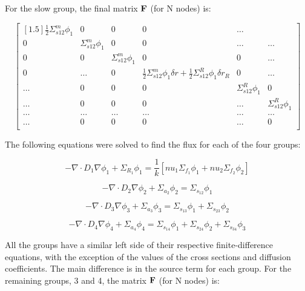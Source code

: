 \documentclass[../main.tex]{subfiles}
\begin{document}
For the slow group, the final matrix $\mathbf{F}$ (for N nodes) is:

\[
	\begin{bmatrix}[1.5]
		\frac{1}{2} \Sigma^m_{s12} \phi_1  & 0 & 0 & 0 & \dots\\
		0 & \Sigma^m_{s12} \phi_1 & 0 & 0 & \dots & \dots \\
		0 & 0 & \Sigma^m_{s12} \phi_1 & 0 & 0 & \dots\\
		0 & \dots & 0 & \frac{1}{2} \Sigma^m_{s12} \phi_1 \delta r + \frac{1}{2} \Sigma^R_{s12} \phi_1 \delta r_R  & 0 & \dots \\
		\dots & 0 & 0 & 0 & \Sigma^R_{s12} \phi_1 & 0 \\
		\dots & 0 & 0 & 0 & \dots & \Sigma^R_{s12} \phi_1 \\
		\dots & \dots & \dots & \dots & \dots & \dots \\
		\dots & 0 & 0 & 0 & \dots & 0 \\
	\end{bmatrix}
	\]

The following equations were solved to find the flux for each of the four groups:

\begin{equation*}
		- \nabla \cdot D_{1} \nabla \phi_{1}+ \Sigma_{R_1} \phi_1 = \frac{1}{k} [nu_1 \Sigma_{f_1} \phi_{1} + nu_2 \Sigma_{f_2} \phi_{2}] 
	\end{equation*}
	
	\begin{equation*}
		- \nabla \cdot D_{2} \nabla \phi_{2}+ \Sigma_{a_2} \phi_2 = \Sigma_{s_{12}} \phi_1
	\end{equation*}
	
	\begin{equation*}
		- \nabla \cdot D_{3} \nabla \phi_{3}+ \Sigma_{a_3} \phi_3 = \Sigma_{s_{13}} \phi_1 + \Sigma_{s_{23}} \phi_2
	\end{equation*}
	
	\begin{equation*}
		- \nabla \cdot D_{4} \nabla \phi_{4}+ \Sigma_{a_4} \phi_4 = \Sigma_{s_{14}} \phi_1 + \Sigma_{s_{24}} \phi_2 + \Sigma_{s_{34}} \phi_3
	\end{equation*}
	
All the groups have a similar left side of their respective finite-difference equations, with the exception of the values of the cross sections and diffusion coefficients.  The main difference is in the source term for each group.  For the remaining groups, 3 and 4, the matrix $\mathbf{F}$ (for N nodes) is:
\end{document}
